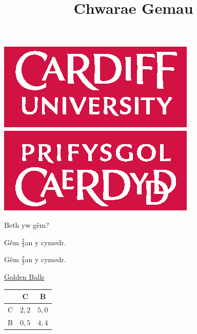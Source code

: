 \documentclass{beamer}
\title{Chwarae Gemau}
\date{}
\begin{document}
\begin{frame}
    \maketitle
	\begin{center}
		\includegraphics[width=.3\textwidth]{./img/CUident_CMYK.eps}
	\end{center}
\end{frame}

\begin{frame}
    \begin{center}
        Beth yw g\^{e}m?
    \end{center}
\end{frame}

\begin{frame}
    \begin{center}
        G\^{e}m \(\frac{2}{3}\)an y cymedr.
    \end{center}
\end{frame}

\begin{frame}
\end{frame}

\begin{frame}
    \begin{center}
        G\^{e}m \(\frac{2}{3}\)an y cymedr.
    \end{center}
\end{frame}

\begin{frame}
    \begin{center}
        \href{https://www.youtube.com/watch?v=p3Uos2fzIJ0}{Golden Balls}
    \end{center}
\end{frame}

\begin{frame}
    \begin{center}
        \Huge
        \begin{tabular}{|c|c|c|}
            \hline
                   & C        & B        \\
            \hline
            C      & \(2, 2\) & \(5, 0\) \\
            \hline
            B      & \(0, 5\) & \(4, 4\) \\
            \hline
        \end{tabular}
    \end{center}
\end{frame}
\end{document}
